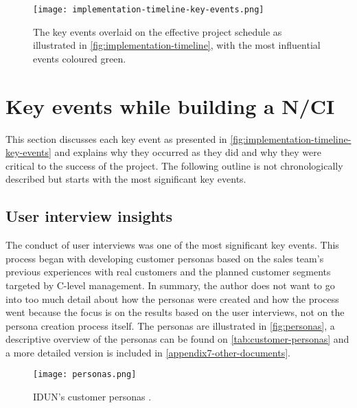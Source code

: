 \begin{figure}[!ht]
  \centering
  \texttt{[image: implementation-timeline-key-events.png]}
  \caption{The key events overlaid on the effective project schedule as illustrated in \autoref{fig:implementation-timeline}, with the most influential events coloured green.}
  \label{fig:implementation-timeline-key-events}
\end{figure}

\section{Key events while building a N/CI}
\label{chapter4-key-events}

This section discusses each key event as presented in \autoref{fig:implementation-timeline-key-events} and explains why they occurred as they did and why they were critical to the success of the project. The following outline is not chronologically described but starts with the most significant key events.

\subsection{User interview insights}
\label{chapter4-user-interview-insights}

The conduct of user interviews was one of the most significant key events. This process began with developing customer personas based on the sales team's previous experiences with real customers and the planned customer segments targeted by C-level management. In summary, the author does not want to go into too much detail about how the personas were created and how the process went because the focus is on the results based on the user interviews, not on the persona creation process itself. The personas are illustrated in \autoref{fig:personas}, a descriptive overview of the personas can be found on \autoref{tab:customer-personas} and a more detailed version is included in \autoref{appendix7-other-documents}.

\begin{figure}[!ht]
  \centering
  \texttt{[image: personas.png]}
  \caption[IDUN's customer personas]{IDUN's customer personas \citep{idun_guardian_nodate}.}
  \label{fig:personas}
\end{figure}

